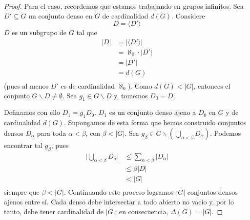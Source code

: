\documentclass[12pt]{report}
\theoremstyle{largebreak}
\newcommand\abs[1]{\ensuremath{\lvert#1\rvert}}
\begin{document}
    \begin{proof}
        Para el caso, recordemos que estamos trabajando en grupos infinitos. Sea $D'\subseteq G$ un conjunto denso en $G$ de cardinalidad $d(G)$. Considere
        \begin{equation*}
            D=\langle D'\rangle
        \end{equation*}
        $D$ es un subgrupo de $G$ tal que
        \begin{equation*}
            \begin{split}
                \abs{D}&=\abs{\langle D'\rangle}\\
                &=\aleph_0\cdot\abs{D'}\\
                &=\abs{D'}\\
                &=d(G)\\
            \end{split}
        \end{equation*}
        (pues al menos $D'$ es de cardinalidad $\aleph_0$). Como $d(G)<\abs{G}$, entonces el conjunto $G\backslash D\neq\emptyset$. Sea $g_1\in G\backslash D$ y, tomemos $D_0=D$.

        Definamos con ello $D_1=g_1D_0$. $D_1$ es un conjunto denso ajeno a $D_0$ en $G$ y de cardinalidad $d(G)$. Supongamos de esta forma que hemos construido conjuntos densos $D_\alpha$ para toda $\alpha<\beta$, con $\beta<\abs{G}$. Sea $g_\beta\in G\backslash\left(\bigcup_{ \alpha<\beta}D_\alpha \right)$. Podemos encontrar tal $g_\beta$, pues
        \begin{equation*}
            \begin{split}
                \abs{\bigcup_{\alpha<\beta}D_\alpha}&\leq\sum_{\alpha<\beta}\abs{D_\alpha}\\
                &\leq\beta\abs{D}\\
                &<\abs{G}\\
            \end{split}
        \end{equation*}
        siempre que $\beta<\abs{G}$. Continuando este proceso logramos $\abs{G}$ conjuntos densos ajenos entre sí. Cada denso debe intersectar a todo abierto no vacío y, por lo tanto, debe tener cardinalidad de $\abs{G}$; en consecuencia, $\Delta(G)=\abs{G}$.
    \end{proof}
\end{document}
